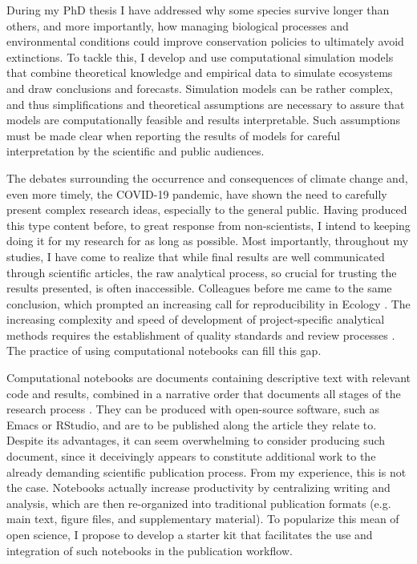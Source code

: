 \documentclass[11pt,]{article}
\begin{document}
During my PhD thesis I have addressed why some species survive longer than others, and more importantly, how managing biological processes and environmental conditions could improve conservation policies to ultimately avoid extinctions.
To tackle this, I develop and use computational simulation models that combine theoretical knowledge and empirical data to simulate ecosystems and draw conclusions and forecasts.
Simulation models can be rather complex, and thus simplifications and theoretical assumptions are necessary to assure that models are computationally feasible and results interpretable.
Such assumptions must be made clear when reporting the results of models for careful interpretation by the scientific and public audiences.

The debates surrounding the occurrence and consequences of climate change and, even more timely, the COVID-19 pandemic, have shown the need to carefully present complex research ideas, especially to the general public.
Having produced this type content before, to great response from non-scientists, I intend to keeping doing it for my research for as long as possible.
Most importantly, throughout my studies, I have come to realize that while final results are well communicated through scientific articles, the raw analytical process, so crucial for trusting the results presented, is often inaccessible.
Colleagues before me came to the same conclusion, which prompted an increasing call for reproducibility in Ecology \cite{culina_low_2020, mislan_elevating_2016}.
The increasing complexity and speed of development of project-specific analytical methods requires the establishment of quality standards and review processes \cite{borregaard_towards_2016}.
The practice of using computational notebooks can fill this gap.

Computational notebooks are documents containing descriptive text with relevant code and results, combined in a narrative order that documents all stages of the research process \cite{rule_ten_2019}.
They can be produced with open-source software, such as Emacs or RStudio, and are to be published along the article they relate to.
Despite its advantages, it can seem overwhelming to consider producing such document, since it deceivingly appears to constitute additional work to the already demanding scientific publication process.
From my experience, this is not the case.
Notebooks actually increase productivity by centralizing writing and analysis, which are then re-organized into traditional publication formats (e.g. main text, figure files, and supplementary material).
To popularize this mean of open science, I propose to develop a starter kit that facilitates the use and integration of such notebooks in the publication workflow.
\end{document}
